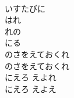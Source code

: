 \documentclass[10pt,b5j]{tarticle} %
\begin{document}
\begin{enumerate}
\begin{minipage}[c]{\blocksize}
        \vspace{\linespace}
        \item~\\
        いすたびに\\
        はれ\\
        れの\\
        にる\\
        のさをえておくれ\\
        のさをえておくれ\\
        にえろ
        えよれ\\
        にえろ
        えよえ
    
    \end{minipage}
\end{enumerate} %
\end{document}
